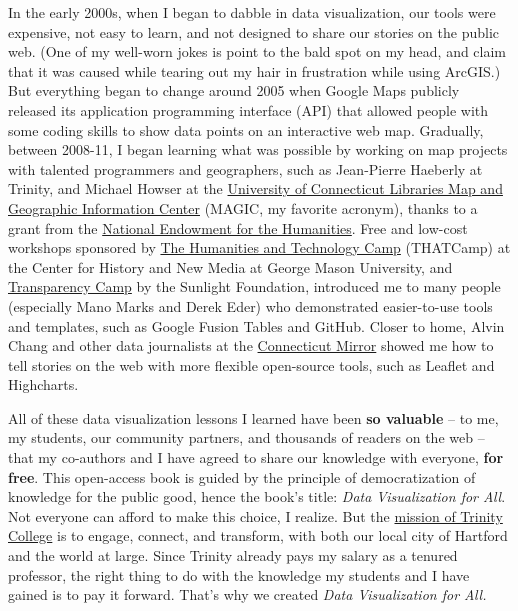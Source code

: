 \documentclass[
  english,
]{book}
\begin{document}
In the early 2000s, when I began to dabble in data visualization, our tools were expensive, not easy to learn, and not designed to share our stories on the public web. (One of my well-worn jokes is point to the bald spot on my head, and claim that it was caused while tearing out my hair in frustration while using ArcGIS.) But everything began to change around 2005 when Google Maps publicly released its application programming interface (API) that allowed people with some coding skills to show data points on an interactive web map. Gradually, between 2008-11, I began learning what was possible by working on map projects with talented programmers and geographers, such as Jean-Pierre Haeberly at Trinity, and Michael Howser at the \href{http://magic.lib.uconn.edu/}{University of Connecticut Libraries Map and Geographic Information Center} (MAGIC, my favorite acronym), thanks to a grant from the \href{http://www.neh.gov}{National Endowment for the Humanities}. Free and low-cost workshops sponsored by \href{http://thatcamp.org}{The Humanities and Technology Camp} (THATCamp) at the Center for History and New Media at George Mason University, and \href{https://sunlightfoundation.com/transparency-camp/}{Transparency Camp} by the Sunlight Foundation, introduced me to many people (especially Mano Marks and Derek Eder) who demonstrated easier-to-use tools and templates, such as Google Fusion Tables and GitHub. Closer to home, Alvin Chang and other data journalists at the \href{http://ctmirror.org}{Connecticut Mirror} showed me how to tell stories on the web with more flexible open-source tools, such as Leaflet and Highcharts.

All of these data visualization lessons I learned have been \textbf{so valuable} -- to me, my students, our community partners, and thousands of readers on the web -- that my co-authors and I have agreed to share our knowledge with everyone, \textbf{for free}. This open-access book is guided by the principle of democratization of knowledge for the public good, hence the book's title: \emph{Data Visualization for All}. Not everyone can afford to make this choice, I realize. But the \href{http://www.trincoll.edu/AboutTrinity/mission/Pages/default.aspx}{mission of Trinity College} is to engage, connect, and transform, with both our local city of Hartford and the world at large. Since Trinity already pays my salary as a tenured professor, the right thing to do with the knowledge my students and I have gained is to pay it forward. That's why we created \emph{Data Visualization for All.}
\end{document}
